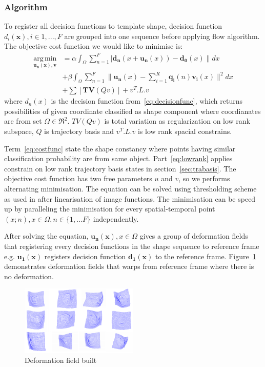 \subsubsection{Algorithm}
To register all decision functions to template shape, decision function $d_i(\bm{x}), i \in {1,...,F}$ are grouped into one sequence before applying flow algorithm. The objective cost function we would like to minimise is:
\begin{align}
    \operatorname*{arg\,min}_{\bm{u_n}(\bm{x}), \bm{v}}&=\alpha \int_{\Omega}\sum_{n=1}^F|\bm{d_n}(x+\bm{u_n}(x))-\bm{d_0}(x)\| dx  \label{eq:costfunc}\\
    &+ \beta \int_{\Omega}\sum_{n=1}^F\|\bm{u_n}(x)-\sum_{i=1}^R\bm{q_i}(n)\bm{v_i}(x)\|^2 dx \label{eq:lowrank}\\
    &+ \sum[\bm{TV}(Qv)]  + v^T.L.v
\end{align}
where $d_n(x)$ is the decision function from~\eqref{eq:decisionfunc}, which returns possibilities of given coordinate classified as shape component where coordianates are from set $\Omega \in \Re^2$. $TV(Qv)$ is total variation as regularization on low rank subspace, $Q$ is trajectory basis and $v^T.L.v$ is low rank spacial constrains.

Term~\eqref{eq:costfunc} state the shape constancy where points having similar classification probability are from same object.
Part~\eqref{eq:lowrank} applies constrain on low rank trajectory basis states in section~\ref{sec:trabasis}.
The objective cost function has two free parameters $u$ and $v$, so we performs alternating minimisation. The equation can be solved using thresholding scheme as used in \cite{?} after linearisation of image functions. The minimisation can be speed up by paralleling the minimisation for every spatial-temporal point $(x;n), x \in \Omega, n \in \{1,...F\}$ independently.

After solving the equation, $\bm{u_n}(\bm{x}), x \in \Omega$ gives a group of deformation fields that registering every decision functions in the shape sequence to reference frame e.g. $\bm{u_1}(\bm{x})$ registers decision function $\bm{d_1}(\bm{x})$ to the reference frame. Figure~\ref{fig:deformationfield} demonstrates deformation fields that warps from reference frame where there is no deformation.

\begin{figure}[h!]
    \centering
        \includegraphics[width=0.5\textwidth]{resources/df}
    \caption{Deformation field built}
    \label{fig:deformationfield}
\end{figure}

